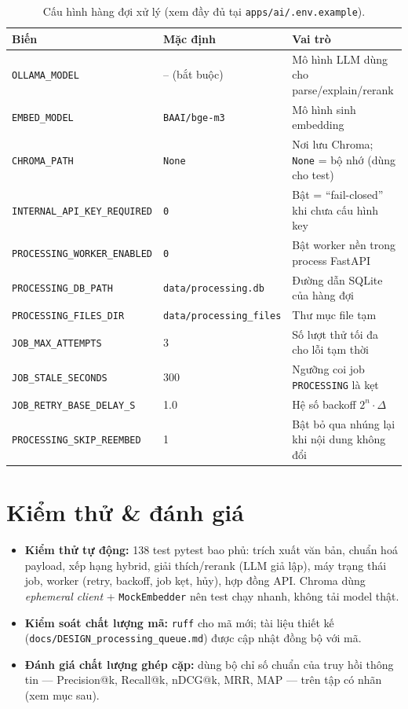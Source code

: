 \documentclass[a4paper,11pt]{article}
\begin{document}
\begin{table}[htbp]
\centering\small
\begin{tabular}{@{}llp{7.6cm}@{}}
\toprule
\textbf{Biến} & \textbf{Mặc định} & \textbf{Vai trò} \\
\midrule
\texttt{OLLAMA\_MODEL} & -- (bắt buộc) & Mô hình LLM dùng cho parse/explain/rerank \\
\texttt{EMBED\_MODEL} & \texttt{BAAI/bge-m3} & Mô hình sinh embedding \\
\texttt{CHROMA\_PATH} & \texttt{None} & Nơi lưu Chroma; \texttt{None} = bộ nhớ (dùng cho test) \\
\texttt{INTERNAL\_API\_KEY\_REQUIRED} & \texttt{0} & Bật = ``fail-closed'' khi chưa cấu hình key \\
\texttt{PROCESSING\_WORKER\_ENABLED} & \texttt{0} & Bật worker nền trong process FastAPI \\
\texttt{PROCESSING\_DB\_PATH} & \texttt{data/processing.db} & Đường dẫn SQLite của hàng đợi \\
\texttt{PROCESSING\_FILES\_DIR} & \texttt{data/processing\_files} & Thư mục file tạm \\
\texttt{JOB\_MAX\_ATTEMPTS} & 3 & Số lượt thử tối đa cho lỗi tạm thời \\
\texttt{JOB\_STALE\_SECONDS} & 300 & Ngưỡng coi job \texttt{PROCESSING} là kẹt \\
\texttt{JOB\_RETRY\_BASE\_DELAY\_S} & 1.0 & Hệ số backoff $2^{n}\cdot\Delta$ \\
\texttt{PROCESSING\_SKIP\_REEMBED} & 1 & Bật bỏ qua nhúng lại khi nội dung không đổi \\
\bottomrule
\end{tabular}
\caption{Cấu hình hàng đợi xử lý (xem đầy đủ tại \texttt{apps/ai/.env.example}).}
\label{tab:env}
\end{table}

\section{Kiểm thử \& đánh giá}

\begin{itemize}[leftmargin=1.2em]
  \item \textbf{Kiểm thử tự động:} 138 test pytest bao phủ: trích xuất văn bản, chuẩn hoá
        payload, xếp hạng hybrid, giải thích/rerank (LLM giả lập), máy trạng thái job,
        worker (retry, backoff, job kẹt, hủy), hợp đồng API. Chroma dùng \emph{ephemeral
        client} + \texttt{MockEmbedder} nên test chạy nhanh, không tải model thật.
  \item \textbf{Kiểm soát chất lượng mã:} \texttt{ruff} cho mã mới; tài liệu thiết kế
        (\texttt{docs/DESIGN\_processing\_queue.md}) được cập nhật đồng bộ với mã.
  \item \textbf{Đánh giá chất lượng ghép cặp:} dùng bộ chỉ số chuẩn của truy hồi
        thông tin --- Precision@k, Recall@k, nDCG@k, MRR, MAP --- trên tập có nhãn
        (xem mục sau).
\end{itemize}
\end{document}
